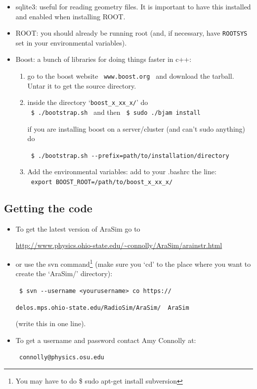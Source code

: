 \documentclass[a4paper,10pt]{article}
\newcommand{\arasim}{AraSim\xspace}
\begin{document}
\begin{itemize}

 \item sqlite3: useful for reading geometry files. It is important to have this installed and enabled when installing ROOT. 

 \item ROOT: you should already be running root (and, if necessary, have \verb|ROOTSYS| set in your environmental variables). 

 \item Boost: a bunch of libraries for doing things faster in c++: 
 
 \begin{enumerate} 
  
  \item go to the boost website \verb| www.boost.org | and download the tarball. Untar it to get the source directory. 
  
  \item inside the directory `\verb|boost_x_xx_x/|' do\\ \verb| $ ./bootstrap.sh | and then \verb| $ sudo ./bjam install| 
  
  if you are installing boost on a server/cluster (and can't sudo anything) do
  
  \verb| $ ./bootstrap.sh --prefix=path/to/installation/directory |
  
  \item Add the environmental variables: add to your .bashrc the line:\\ \verb| export BOOST_ROOT=/path/to/boost_x_xx_x/ |
   
 \end{enumerate}
 
 

\end{itemize}

\subsection{Getting the code}

\begin{itemize}

\item To get the latest version of \arasim go to 

\url{http://www.physics.ohio-state.edu/~connolly/AraSim/arainstr.html}

\item or use the svn command\footnote{You may have to do \$ sudo apt-get install subversion} (make sure you `cd' to the place where you want to create the `AraSim/' directory): 

\verb| $ svn --username <yourusername> co https://|

\verb|delos.mps.ohio-state.edu/RadioSim/AraSim/  AraSim | 

(write this in one line). 

\item To get a username and password contact Amy Connolly at: 

\verb| connolly@physics.osu.edu | 

\end{itemize}
\end{document}
